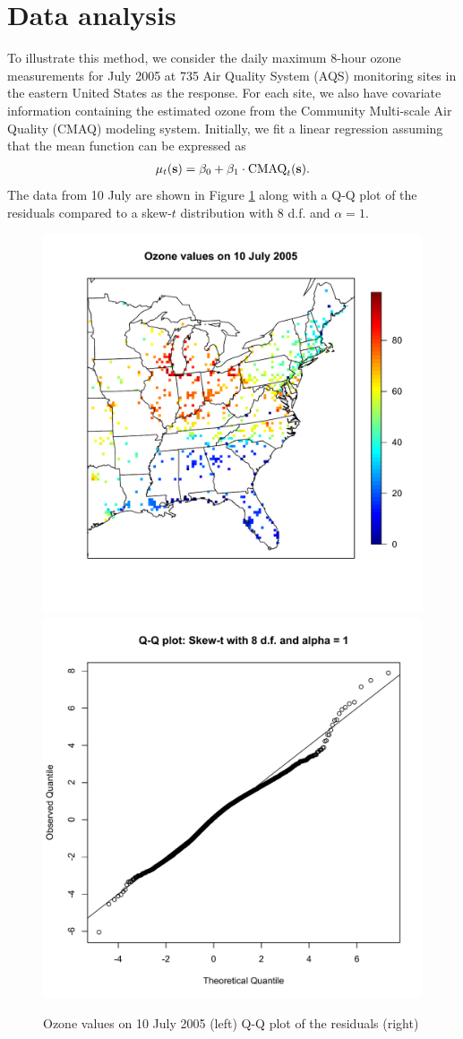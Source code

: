 \documentclass[11pt]{article}
\begin{document}
\section{Data analysis}\label{s:analysis}
To illustrate this method, we consider the daily maximum 8-hour ozone measurements for July 2005 at 735 Air Quality System (AQS) monitoring sites in the eastern United States as the response.
For each site, we also have covariate information containing the estimated ozone from the Community Multi-scale Air Quality (CMAQ) modeling system.
Initially, we fit a linear regression assuming that the mean function can be expressed as
\begin{align}
  \mu_t(\mbox{\bf s}) = \beta_0 + \beta_1 \cdot \text{CMAQ}_t(\mbox{\bf s}). \label{eq:datamean}
\end{align}
The data from 10 July are shown in Figure \ref{fig:ozone} along with a Q-Q plot of the residuals compared to a skew-$t$ distribution with 8 d.f. and $\alpha = 1$.
\begin{center}
\begin{figure}
  \includegraphics[width=0.5\linewidth]{plots/ozone-10jul.pdf}
  \includegraphics[width=0.5\linewidth]{plots/qq-res.pdf}
  \caption{Ozone values on 10 July 2005 (left) Q-Q plot of the residuals (right)}
  \label{fig:ozone}
\end{figure}
\end{center}
\end{document}
